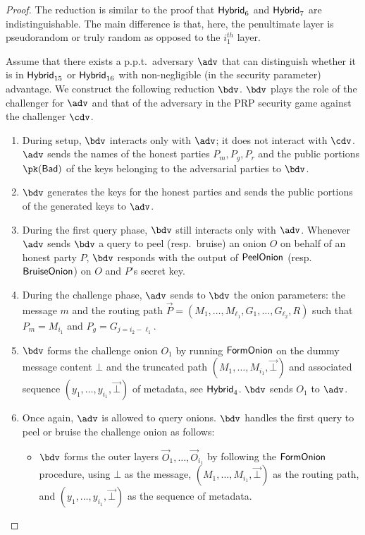 \documentclass[runningheads,a4paper]{llncs}
\begin{document}
\begin{proof}
The reduction is similar to the proof that $\mathsf{Hybrid}_{6}$ and $\mathsf{Hybrid}_{7}$ are indistinguishable. The main difference is that, here, the penultimate layer is pseudorandom or truly random as opposed to the $i_1^\mathit{th}$ layer. 

Assume that there exists a p.p.t.~adversary $\adv$ that can distinguish whether it is in $\mathsf{Hybrid}_{15}$ or $\mathsf{Hybrid}_{16}$ with non-negligible (in the security parameter)  advantage. 
We construct the following reduction $\bdv$. $\bdv$ plays the role of the challenger for $\adv$ and that of the adversary in the PRP security game against the  challenger $\cdv$. 

\begin{enumerate}
\item During setup, $\bdv$ interacts only with $\adv$; it does not interact with $\cdv$. $\adv$ sends the names of the honest parties $P_m, P_g, P_r$ and the public portions $\pk(\Bad)$ of the keys  belonging to the adversarial parties to $\bdv$. 

\item $\bdv$ generates the keys for the honest parties and sends the public portions of the generated keys to $\adv$. 

\item During the first query phase, $\bdv$ still interacts only with $\adv$. Whenever $\adv$ sends $\bdv$ a query to peel (resp.~bruise) an onion $O$ on behalf of an honest party $P$, $\bdv$ responds with the output of $\mathsf{PeelOnion}$ (resp.~$\mathsf{BruiseOnion}$) on $O$ and $P$'s secret key. 

\item During the challenge phase, $\adv$ sends to $\bdv$ the onion parameters: the message $m$ and the routing path $\vec{P} = (M_1, \dots, M_{\ell_1}, G_1, \dots, G_{\ell_2}, R)$ such that $P_m = M_{i_1}$ and $P_g = G_{j=i_2-\ell_1}$. 

\item $\bdv$ forms the challenge onion $O_1$ by running $\mathsf{FormOnion}$ on the dummy message content $\bot$ and the truncated path $(M_1, \dots, M_{i_1}, \vec{\bot})$ and associated sequence $(y_1, \dots, y_{i_1}, \vec{\bot})$ of metadata, see $\mathsf{Hybrid}_{4}$. 
$\bdv$ sends $O_1$ to $\adv$.  

\item Once again, $\adv$ is allowed to query onions. $\bdv$ handles the first query to peel or bruise the challenge onion as follows:  
\begin{itemize}
    \item  $\bdv$ forms the outer layers $\vec{O}_{1}, \dots, \vec{O}_{i_1}$ by following the $\mathsf{FormOnion}$ procedure, using $\bot$ as the message, $(M_{1}, \dots, M_{i_1}, \vec{\bot})$ as the routing path, and $(y_{1}, \dots, y_{i_1}, \vec{\bot})$ as the sequence of metadata.
    

\end{itemize}
\end{enumerate}
\end{proof}
\end{document}
